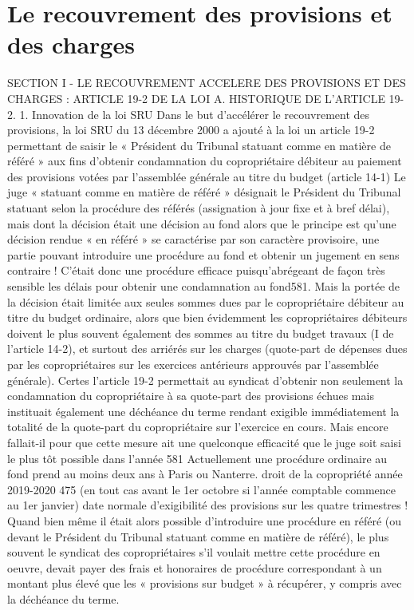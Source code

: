 \chapter{Le recouvrement des provisions et des charges}

SECTION I - LE RECOUVREMENT ACCELERE DES PROVISIONS ET DES CHARGES : ARTICLE 19-2 DE LA LOI
A. HISTORIQUE DE L'ARTICLE 19-2.
1. Innovation de la loi SRU
Dans le but d’accélérer le recouvrement des provisions, la loi SRU du 13 décembre 2000 a ajouté à la loi un article 19-2 permettant de saisir le « Président du Tribunal statuant comme en matière de référé » aux fins d’obtenir condamnation du copropriétaire débiteur au paiement des provisions votées par l’assemblée générale au titre du budget (article 14-1)
Le juge « statuant comme en matière de référé » désignait le Président du Tribunal statuant selon la procédure des référés (assignation à jour fixe et à bref délai), mais dont la décision était une décision au fond alors que le principe est qu’une décision rendue « en référé » se caractérise par son caractère provisoire, une partie pouvant introduire une procédure au fond et obtenir un jugement en sens contraire !
C’était donc une procédure efficace puisqu’abrégeant de façon très sensible les délais pour obtenir une condamnation au fond581.
Mais la portée de la décision était limitée aux seules sommes dues par le copropriétaire débiteur au titre du budget ordinaire, alors que bien évidemment les copropriétaires débiteurs doivent le plus souvent également des sommes au titre du budget travaux (I de l’article 14-2), et surtout des arriérés sur les charges (quote-part de dépenses dues par les copropriétaires sur les exercices antérieurs approuvés par l’assemblée générale).
Certes l’article 19-2 permettait au syndicat d’obtenir non seulement la condamnation du copropriétaire à sa quote-part des provisions échues mais instituait également une déchéance du terme rendant exigible immédiatement la totalité de la quote-part du copropriétaire sur l’exercice en cours. Mais encore fallait-il pour que cette mesure ait une quelconque efficacité que le juge soit saisi le plus tôt possible dans l’année
581 Actuellement une procédure ordinaire au fond prend au moins deux ans à Paris ou Nanterre.
droit de la copropriété année 2019-2020
475
(en tout cas avant le 1er octobre si l’année comptable commence au 1er janvier) date normale d’exigibilité des provisions sur les quatre trimestres !
Quand bien même il était alors possible d’introduire une procédure en référé (ou devant le Président du Tribunal statuant comme en matière de référé), le plus souvent le syndicat des copropriétaires s’il voulait mettre cette procédure en oeuvre, devait payer des frais et honoraires de procédure correspondant à un montant plus élevé que les « provisions sur budget » à récupérer, y compris avec la déchéance du terme.
